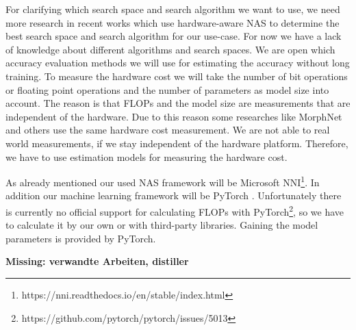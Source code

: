 \documentclass[conference]{IEEEtran}
\begin{document}
For clarifying which search space and search algorithm we want to use, we need more research in recent works which use hardware-aware NAS to determine the best search space and search algorithm for our use-case. For now we have a lack of knowledge about different algorithms and search spaces. We are open which accuracy evaluation methods we will use for estimating the accuracy without long training. To measure the hardware cost we will take the number of bit operations or floating point operations and the number of parameters as model size into account. The reason is that FLOPs and the model size are measurements that are independent of the hardware. Due to this reason some researches like MorphNet \cite{bib10} and others \cite{bib5}\cite{bib11} use the same hardware cost measurement. We are not able to real world measurements, if we stay independent of the hardware platform. Therefore, we have to use estimation models for measuring the hardware cost. 

As already mentioned our used NAS framework will be Microsoft NNI\footnote{https://nni.readthedocs.io/en/stable/index.html}. In addition our machine learning framework will be PyTorch \cite{bib4}. Unfortunately there is currently no official support for calculating FLOPs with PyTorch\footnote{https://github.com/pytorch/pytorch/issues/5013}, so we have to calculate it by our own or with third-party libraries. Gaining the model parameters is provided by PyTorch.

\textbf{Missing: verwandte Arbeiten, distiller}
\end{document}
